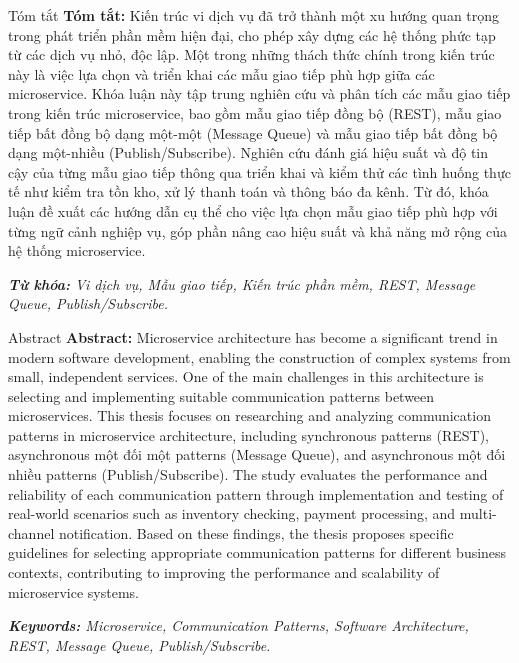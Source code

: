 \documentclass{uetgraduation}
\begin{document}
\begin{preamble}{Tóm tắt}
    \textbf{Tóm tắt:} Kiến trúc vi dịch vụ đã trở thành  một xu hướng quan trọng trong phát triển phần mềm hiện đại, cho phép xây dựng các hệ thống phức tạp từ các dịch vụ nhỏ, độc lập. Một trong những thách thức chính trong kiến trúc này là việc lựa chọn và triển khai các mẫu giao tiếp phù hợp giữa các microservice. Khóa luận này tập trung nghiên cứu và phân tích các mẫu giao tiếp trong kiến trúc microservice, bao gồm mẫu giao tiếp đồng bộ (REST), mẫu giao tiếp bất đồng bộ dạng một-một (Message Queue) và mẫu giao tiếp bất đồng bộ dạng một-nhiều (Publish/Subscribe). Nghiên cứu đánh giá hiệu suất và độ tin cậy của từng mẫu giao tiếp thông qua triển khai và kiểm thử các tình huống thực tế như kiểm tra tồn kho, xử lý thanh toán và thông báo đa kênh. Từ đó, khóa luận đề xuất các hướng dẫn cụ thể cho việc lựa chọn mẫu giao tiếp phù hợp với từng ngữ cảnh nghiệp vụ, góp phần nâng cao hiệu suất và khả năng mở rộng của hệ thống microservice.

    \textit{\textbf{Từ khóa:} Vi dịch vụ, Mẫu giao tiếp, Kiến trúc phần mềm, REST, Message Queue, Publish/Subscribe.}
\end{preamble}

\begin{preamble}{Abstract}
    \textbf{Abstract:} Microservice architecture has become a significant trend in modern software development, enabling the construction of complex systems from small, independent services. One of the main challenges in this architecture is selecting and implementing suitable communication patterns between microservices. This thesis focuses on researching and analyzing communication patterns in microservice architecture, including synchronous patterns (REST), asynchronous một đối một patterns (Message Queue), and asynchronous một đối nhiều patterns (Publish/Subscribe). The study evaluates the performance and reliability of each communication pattern through implementation and testing of real-world scenarios such as inventory checking, payment processing, and multi-channel notification. Based on these findings, the thesis proposes specific guidelines for selecting appropriate communication patterns for different business contexts, contributing to improving the performance and scalability of microservice systems.

    \textit{\textbf{Keywords:} Microservice, Communication Patterns, Software Architecture, REST, Message Queue, Publish/Subscribe.}
\end{preamble}
\end{document}
